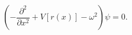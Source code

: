 \begin{equation} \label{dex}
\left( - \frac{\partial^2}{\partial x^2} + V[r(x)] - \omega^2 \right) \psi = 0.
\end{equation}


